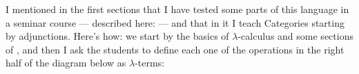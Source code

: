 \documentclass[oneside,12pt]{article}
\begin{document}
I mentioned in the first sections that I have tested some parts of
this language in a seminar course --- described here:
\cite{OchsWLD2019} --- and that in it I teach Categories starting by
adjunctions. Here's how: we start by the basics of $λ$-calculus and
some sections of \cite{PH1}, and then I ask the students to define
each one of the operations in the right half of the diagram below as
$λ$-terms:
%
%
\end{document}
